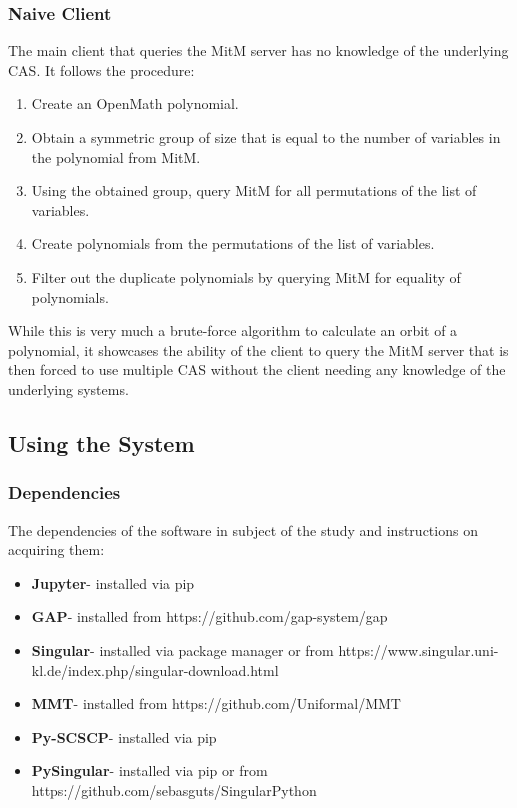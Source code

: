 \subsubsection{Naive Client}
The main client that queries the MitM server has no knowledge of the underlying 
CAS. It follows the procedure:
\begin{enumerate}
  \item Create an OpenMath polynomial.
  \item Obtain a symmetric group of size that is equal to the number of variables 
    in the polynomial from MitM.
  \item Using the obtained group, query MitM for all permutations of the list 
    of variables.
  \item Create polynomials from the permutations of the list of variables.
  \item Filter out the duplicate polynomials by querying MitM for equality of 
    polynomials.
\end{enumerate}
While this is very much a brute-force algorithm to calculate an orbit of a
polynomial, it showcases the ability of the client to query the MitM server that 
is then forced to use multiple CAS without the client needing any knowledge of the
underlying systems.

\subsection{Using the System}
\subsubsection{Dependencies}
The dependencies of the software in subject of the study and instructions on
acquiring them:
\begin{itemize}
  \item \textbf{Jupyter}- installed via pip
  \item \textbf{GAP}- installed from https://github.com/gap-system/gap
  \item \textbf{Singular}- installed via package manager or from
    https://www.singular.uni-kl.de/index.php/singular-download.html
  \item \textbf{MMT}- installed from https://github.com/Uniformal/MMT
  \item \textbf{Py-SCSCP}- installed via pip
  \item \textbf{PySingular}- installed via pip or from 
    https://github.com/sebasguts/SingularPython
\end{itemize}

